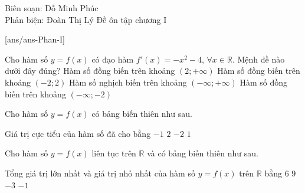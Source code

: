 ﻿\begin{name}
 {Biên soạn: Đỗ Minh Phúc \\ Phản biện: Đoàn Thị Lý}
 {Đề ôn tập chương I}
\end{name}

\caulc
{}[ans/ans\currfilebase-Phan-I]
\begin{ex}%
 Cho hàm số $y=f(x)$ có đạo hàm $f'(x)=-x^2-4$, $\forall x \in \mathbb{R}$. Mệnh đề nào dưới đây đúng?
\choice
{Hàm số đồng biến trên khoảng $(2;+\infty)$}
{Hàm số đồng biến trên khoảng $(-2;2)$}
{\True Hàm số nghịch biến trên khoảng $(-\infty;+\infty)$}
{Hàm số đồng biến trên khoảng $(-\infty;-2)$}
\end{ex}

\begin{ex}%
 Cho hàm số $y=f(x)$ có bảng biến thiên như sau.
 \begin{center}
 \end{center}
 Giá trị cực tiểu của hàm số đã cho bằng
 \choice
 {$-1$}
 {$2$}
 {\True $-2$}
 {$1$}
\end{ex}

\begin{ex}%
 Cho hàm số $y=f(x)$ liên tục trên $\mathbb{R}$ và có bảng biến thiên như sau.
 \begin{center}
\end{center}
 Tổng giá trị lớn nhất và giá trị nhỏ nhất của hàm số $y=f(x)$ trên $\mathbb{R}$ bằng
 \choice
 {$6$}
 {$9$}
 {$-3$}
 {\True $-1$}
\end{ex}

